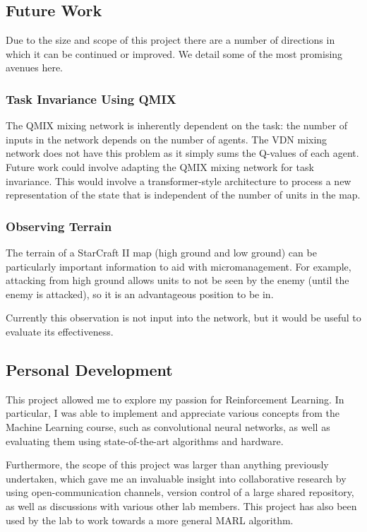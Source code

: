 \subsection{Future Work}

Due to the size and scope of this project there are a number of directions in which it can be continued or improved. We detail some of the most promising avenues here.


\subsubsection{Task Invariance Using QMIX}

The QMIX mixing network is inherently dependent on the task: the number of inputs in the network depends on the number of agents. The VDN mixing network does not have this problem as it simply sums the Q-values of each agent. Future work could involve adapting the QMIX mixing network for task invariance. This would involve a transformer-style architecture to process a new representation of the state that is independent of the number of units in the map.


\subsubsection{Observing Terrain}

The terrain of a StarCraft II map (high ground and low ground) can be particularly important information to aid with micromanagement. For example, attacking from high ground allows units to not be seen by the enemy (until the enemy is attacked), so it is an advantageous position to be in.

Currently this observation is not input into the network, but it would be useful to evaluate its effectiveness.


\subsection{Personal Development}
This project allowed me to explore my passion for Reinforcement Learning. In particular, I was able to implement and appreciate various concepts from the Machine Learning course, such as convolutional neural networks, as well as evaluating them using state-of-the-art algorithms and hardware.

Furthermore, the scope of this project was larger than anything previously undertaken, which gave me an invaluable insight into collaborative research by using open-communication channels, version control of a large shared repository, as well as discussions with various other lab members. This project has also been used by the lab to work towards a more general MARL algorithm.